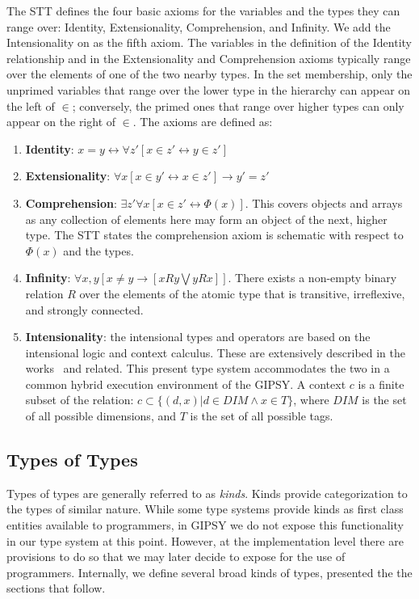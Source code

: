 \documentclass{easychair}
\newcommand{\gipsy}{{GIPSY\index{GIPSY}}}
\begin{document}
The STT defines the four basic axioms for the variables and the
types they can range over: Identity, Extensionality, Comprehension,
and Infinity. We add the Intensionality on as the fifth axiom. The variables in the definition
of the Identity relationship and in the Extensionality and Comprehension
axioms typically range over the elements of one of the two
nearby types. In the set membership, only the unprimed variables
that range over the lower type in the hierarchy can appear on the
left of $\in$; conversely, the primed ones that range over higher
types can only appear on the right of $\in$. The axioms are defined as:


\begin{enumerate}
\item
{\bf Identity}: $x = y \leftrightarrow \forall z' [x \in z' \leftrightarrow y \in z']$
\item
{\bf Extensionality}: $\forall x[x \in y' \leftrightarrow x \in z'] \rightarrow y' = z'$
\item
{\bf Comprehension}: $\exists z' \forall x[x \in z' \leftrightarrow \Phi(x)]$. This covers objects and arrays as any collection of elements here may form
an object of the next, higher type. The STT states the comprehension axiom is schematic with respect to $\Phi(x)$ and the types.
\item
{\bf Infinity}: $\forall x,y[x \neq y \rightarrow [xRy \bigvee yRx]]$. There exists a non-empty binary relation $R$ over the elements of the atomic type that is transitive, irreflexive, and strongly connected. 
\item
{\bf Intensionality}: the intensional types and operators are based on the intensional logic and context calculus. These are extensively described in the works~\cite{gipsy-simple-context-calculus-08,gipsy-context-calculus-07,wanphd06,paquetThesis} and related. This present type system accommodates the two in a common
hybrid execution environment of the {\gipsy}.
A context $c$ is a finite subset of the relation: $c \subset \{(d, x) | d \in DIM \wedge x \in T\}$, where $DIM$ is the set of all possible dimensions, and $T$ is the set of all possible tags.
\end{enumerate}


\subsection{Types of Types}

Types of types are generally referred to as {\em kinds}.
Kinds provide categorization to the types of similar nature.
While some type systems provide kinds as first class entities
available to programmers, in {\gipsy} we do not expose this
functionality in our type system at this point. However,
at the implementation level there are provisions to do so
that we may later decide to expose for the use of programmers.
Internally, we define several broad kinds of types, presented
the the sections that follow.
\end{document}
